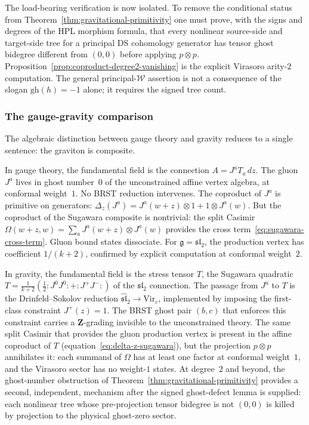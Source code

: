 \begin{remark}
\label{rem:principal-ds-ghost-defect-obligation}
The load-bearing verification is now isolated. To remove the
conditional status from Theorem~\ref{thm:gravitational-primitivity}
one must prove, with the signs and degrees of the HPL morphism formula,
that every nonlinear source-side and target-side tree for a principal
DS cohomology generator has tensor ghost bidegree different from
\((0,0)\) before applying \(p\otimes p\).
Proposition~\ref{prop:coproduct-degree2-vanishing} is the explicit
Virasoro arity-$2$ computation. The general principal-\(\mathcal W\)
assertion is not a consequence of the slogan \(\mathrm{gh}(h)=-1\)
alone; it requires the signed tree count.
\end{remark}

\subsubsection*{The gauge-gravity comparison}

The algebraic distinction between gauge theory and gravity
reduces to a single sentence: the graviton is composite.

In gauge theory, the fundamental field is the connection
$A = J^a T_a\,dz$. The gluon $J^a$ lives in ghost number~$0$
of the unconstrained affine vertex algebra, at conformal
weight~$1$. No BRST reduction intervenes. The coproduct of
$J^a$ is primitive on generators:
$\Delta_z(J^a) = J^a(w+z) \otimes 1 + 1 \otimes J^a(w)$.
But the coproduct of the Sugawara composite is
nontrivial: the split Casimir
$\Omega(w+z,w) = \sum_a J^a(w+z) \otimes J^a(w)$ provides the
cross term~\eqref{eq:sugawara-cross-term}. Gluon bound states
dissociate. For $\mathfrak{g} = \mathfrak{sl}_2$, the
production vertex has coefficient $1/(k+2)$, confirmed by
explicit computation at conformal weight~$2$.

In gravity, the fundamental field is the stress tensor $T$,
the Sugawara quadratic
$T = \frac{1}{k+2}(\frac{1}{2}{:}J^0 J^0{:}
+ {:}J^+ J^-{:})$
of the $\mathfrak{sl}_2$ connection. The passage from $J^a$ to
$T$ is the Drinfeld--Sokolov reduction
$\widehat{\mathfrak{sl}}_2 \to \mathrm{Vir}_c$, implemented by
imposing the first-class constraint $J^+(z) = 1$. The BRST
ghost pair $(b,c)$ that enforces this constraint carries a
$\mathbf{Z}$-grading invisible to the unconstrained theory.
The same split Casimir that provides the gluon production
vertex is present in the affine coproduct of $T$
(equation~\eqref{eq:delta-z-sugawara}), but the projection
$p \otimes p$ annihilates it: each summand of $\Omega$ has at
least one factor at conformal weight~$1$, and the Virasoro
sector has no weight-$1$ states. At degree~$2$ and beyond, the
ghost-number obstruction of
Theorem~\ref{thm:gravitational-primitivity} provides a second,
independent, mechanism after the signed ghost-defect lemma is supplied:
each nonlinear tree whose pre-projection tensor bidegree is not
\((0,0)\) is killed by projection to the physical ghost-zero sector.

